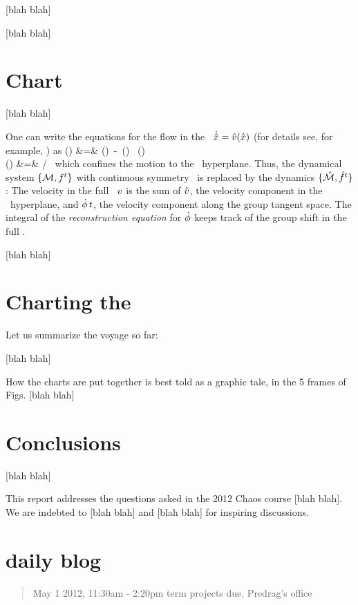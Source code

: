 \documentclass[aip,cha,reprint,
secnumarabic,
nofootinbib, tightenlines,
nobibnotes, showkeys, showpacs,
groupedaddress
]{revtex4-1}
\begin{document}
 [blah blah]

 [blah blah]

\section{Chart}
\label{s:slice}

 [blah blah]

One can write the equations for the flow in the \reducedsp\
$\dot{\hat{x}} = \hat{v}(\hat{x})$ (for details see, for example,
\refref{DasBuch}) as
\bea
\velRed(\sspRed) &=& \vel(\sspRed)
     \,-\, \dot{\gSpace}(\sspRed) \, \groupTan(\sspRed)
\label{2modesEqMotMFrame}\\
\dot{\gSpace}(\sspRed) &=& \braket{\vel(\sspRed)}{\sliceTan{}}
                       /\braket{\groupTan(\sspRed)}{\sliceTan{}}
\,
\label{2modesreconstrEq}
\eea
which confines the motion to the \slice\ hyperplane. Thus, the dynamical
system $\{{\cal M},f^t\}$ with continuous symmetry \Group\ is replaced by
the {\reducedsp} dynamics $\{\hat{\cal M},\hat{f}^t\}$: The velocity in the
full \statesp\ $v$ is the sum of $\hat{v}$, the velocity component in
the \slice\ hyperplane, and $\dot{{\bf \phi}}\,t$, the velocity
component along the group tangent space. The integral of the {\em
reconstruction equation} for $\dot{{\bf \phi}}$ keeps track of the group
shift in the full \statesp.


 [blah blah]

\section{Charting the \slice}
\label{s:chart}

Let us summarize the voyage so far:

 [blah blah]


How the charts are put together is best told as a graphic tale, in the 5
frames of Figs.  [blah blah]



\section{Conclusions}
\label{s:concl}

 [blah blah]

\begin{acknowledgments}
This report addresses the questions asked in the  2012 Chaos course
[blah blah].
We are indebted to
 [blah blah]
and
 [blah blah]
for inspiring discussions.
\end{acknowledgments}





\ifdraft
    \onecolumngrid

    \newpage

    \newpage
    \section{{\twoMode} daily blog}
    \label{chap:2modes}


\vfill
\begin{quote}
{\color{red} \large
May 1 2012,  11:30am - 2:20pm term projects due, Predrag's office
}
\end{quote}

\fi
\end{document}
